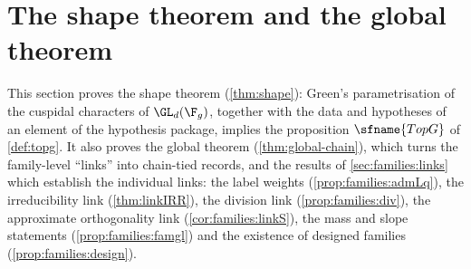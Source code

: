 \section{The shape theorem and the global theorem}\label{sec:pf:top-shape}

\providecommand{\topshapeCl}{\mathrm{Closed}}
\providecommand{\topshapeLarge}{\mathrm{Large}}
\providecommand{\topshapeDes}{\mathrm{Des}}
\providecommand{\topshapeD}{\mathcal{D}_3}
\providecommand{\topshapeF}{\mathcal{F}}
\providecommand{\topshapeWin}{\mathrm{Win}}
\providecommand{\topshapeEta}{\eta\Sigma}
\providecommand{\topshapeVV}{\mathrm{vv}}
\providecommand{\topshapewt}{\mathrm{wt}}

This section proves the shape theorem (\cref{thm:shape}): Green's parametrisation of the cuspidal characters
of $\GL_d(\F_g)$, together with the data and hypotheses of an element of the hypothesis package, implies the
proposition $\sfname{TopG}$ of \cref{def:topg}. It also proves the global theorem (\cref{thm:global-chain}),
which turns the family-level ``links'' into chain-tied records, and the results of \cref{sec:families:links}
which establish the individual links: the label weights (\cref{prop:families:admLq}), the irreducibility link
(\cref{thm:linkIRR}), the division link (\cref{prop:families:div}), the approximate orthogonality link
(\cref{cor:families:linkS}), the mass and slope statements (\cref{prop:families:famgl}) and the existence of
designed families (\cref{prop:families:design}).

